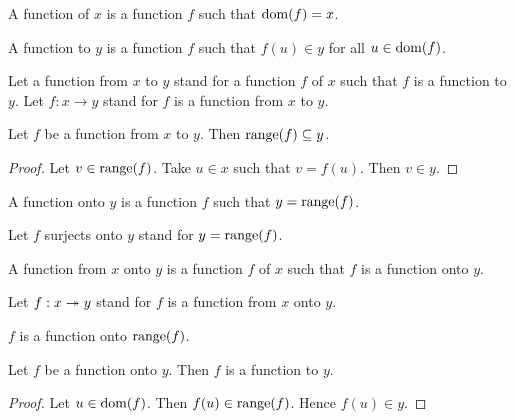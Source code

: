 \documentclass[../../set-theory.ftl.tex]{subfiles}
\begin{document}
  \begin{forthel}
    \begin{definition}
      A function of $x$ is a function $f$ such that $\operatorname{dom}(f) = x$.
    \end{definition}

    \begin{definition}
      A function to $y$ is a function $f$ such that $f(u) \in y$ for all $u \in \operatorname{dom}(f)$.
    \end{definition}

    Let a function from $x$ to $y$ stand for a function $f$ of $x$ such that $f$ is a function to $y$.
    Let $f: x \to y$ stand for $f$ is a function from $x$ to $y$.

    \begin{proposition}\label{SetTheory_02_01_694542}
      Let $f$ be a function from $x$ to $y$.
      Then $\operatorname{range}(f) \subseteq y$.
    \end{proposition}
    \begin{proof}
      Let $v \in \operatorname{range}(f)$.
      Take $u \in x$ such that $v = f(u)$.
      Then $v \in y$.
    \end{proof}

    \begin{definition}
      A function onto $y$ is a function $f$ such that $y = \operatorname{range}(f)$.
    \end{definition}

    Let $f$ surjects onto $y$ stand for $y = \operatorname{range}(f)$.

    \begin{definition}
      A function from $x$ onto $y$ is a function $f$ of $x$ such that $f$ is a function onto $y$.
    \end{definition}

    Let $f: x \twoheadrightarrow y$ stand for $f$ is a function from $x$ onto $y$.

    \begin{proposition}\label{SetTheory_02_01_677451}
      $f$ is a function onto $\operatorname{range}(f)$.
    \end{proposition}

    \begin{proposition}\label{SetTheory_02_01_495468}
      Let $f$ be a function onto $y$.
      Then $f$ is a function to $y$.
    \end{proposition}
    \begin{proof}
      Let $u \in \operatorname{dom}(f)$.
      Then $f(u) \in \operatorname{range}(f)$.
      Hence $f(u) \in y$.
    \end{proof}


\end{forthel}
\end{document}
